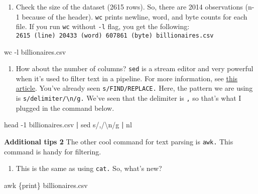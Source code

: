 \documentclass[
]{book}
\newenvironment{Shaded}{\begin{snugshade}}{\end{snugshade}}
\newcommand{\AttributeTok}[1]{\textcolor[rgb]{0.77,0.63,0.00}{#1}}
\newcommand{\FunctionTok}[1]{\textcolor[rgb]{0.00,0.00,0.00}{#1}}
\newcommand{\KeywordTok}[1]{\textcolor[rgb]{0.13,0.29,0.53}{\textbf{#1}}}
\newcommand{\NormalTok}[1]{#1}
\newcommand{\StringTok}[1]{\textcolor[rgb]{0.31,0.60,0.02}{#1}}
\providecommand{\tightlist}{%
  \setlength{\itemsep}{0pt}\setlength{\parskip}{0pt}}
\begin{document}
\begin{enumerate}
\def\labelenumi{\arabic{enumi}.}
\setcounter{enumi}{2}
\tightlist
\item
  Check the size of the dataset (2615 rows). So, there are 2014 observations (n-1 because of the header). \texttt{wc} prints newline, word, and byte counts for each file. If you run \texttt{wc} without \texttt{-l} flag, you get the following: \texttt{2615\ (line)\ 20433\ (word)\ 607861\ (byte)\ billionaires.csv}
\end{enumerate}

\begin{Shaded}
\begin{Highlighting}[]
\FunctionTok{wc} \AttributeTok{{-}l}\NormalTok{ billionaires.csv}
\end{Highlighting}
\end{Shaded}

\begin{enumerate}
\def\labelenumi{\arabic{enumi}.}
\setcounter{enumi}{3}
\tightlist
\item
  How about the number of columns? \texttt{sed} is a stream editor and very powerful when it's used to filter text in a pipeline. For more information, see \href{https://www.gnu.org/software/sed/manual/sed.html}{this article}. You've already seen \texttt{s/FIND/REPLACE.} Here, the pattern we are using is \texttt{s/delimiter/\textbackslash{}n/g.} We've seen that the delimiter is \texttt{,} so that's what I plugged in the command below.
\end{enumerate}

\begin{Shaded}
\begin{Highlighting}[]
\FunctionTok{head} \AttributeTok{{-}1}\NormalTok{ billionaires.csv }\KeywordTok{|} \FunctionTok{sed} \StringTok{\textquotesingle{}s/,/\textbackslash{}n/g\textquotesingle{}} \KeywordTok{|} \FunctionTok{nl}
\end{Highlighting}
\end{Shaded}

\textbf{Additional tips 2}
The other cool command for text parsing is \texttt{awk.} This command is handy for filtering.

\begin{enumerate}
\def\labelenumi{\arabic{enumi}.}
\tightlist
\item
  This is the same as using \texttt{cat.} So, what's new?
\end{enumerate}

\begin{Shaded}
\begin{Highlighting}[]
\FunctionTok{awk} \StringTok{\textquotesingle{}\{print\}\textquotesingle{}}\NormalTok{ billionaires.csv }
\end{Highlighting}
\end{Shaded}
\end{document}
